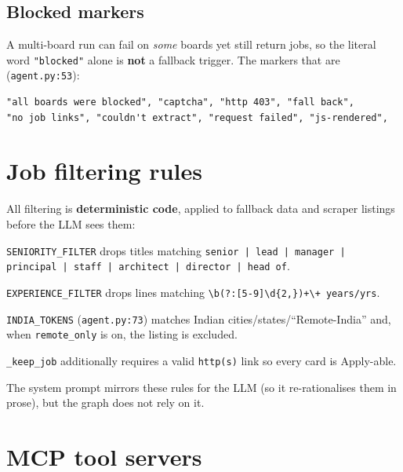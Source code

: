 \documentclass[11pt,a4paper]{article}
\newcommand{\file}[1]{\texttt{\small #1}}
\newcommand{\tool}[1]{\texttt{#1}}
\begin{document}
\subsection{Blocked markers}
A multi-board run can fail on \emph{some} boards yet still return jobs, so the
literal word \tool{"blocked"} alone is \textbf{not} a fallback trigger. The
markers that are (\file{agent.py:53}):
\begin{lstlisting}
"all boards were blocked", "captcha", "http 403", "fall back",
"no job links", "couldn't extract", "request failed", "js-rendered",
\end{lstlisting}

\section{Job filtering rules}
\label{sec:filters}

All filtering is \textbf{deterministic code}, applied to fallback data and
scraper listings before the LLM sees them:

\begin{description}[leftmargin=5.5em]
  \item[Seniority] \tool{SENIORITY\_FILTER} drops titles matching
        \tool{senior\,|\,lead\,|\,manager\,|\,principal\,|\,staff\,|\,architect\,|\,director\,|\,head of}.
  \item[Experience] \tool{EXPERIENCE\_FILTER} drops lines matching
        \tool{\textbackslash b(?:[5-9]\textbar\textbackslash d\{2,\})+\textbackslash+ years/yrs}.
  \item[Geography] \tool{INDIA\_TOKENS} (\file{agent.py:73}) matches Indian
        cities/states/``Remote-India'' and, when \tool{remote\_only} is on,
        the listing is excluded.
  \item[Links] \tool{\_keep\_job} additionally requires a valid \tool{http(s)}
        link so every card is Apply-able.
\end{description}

The system prompt mirrors these rules for the LLM (so it re-rationalises them
in prose), but the graph does not rely on it.

\section{MCP tool servers}
\label{sec:mcp}
\end{document}
